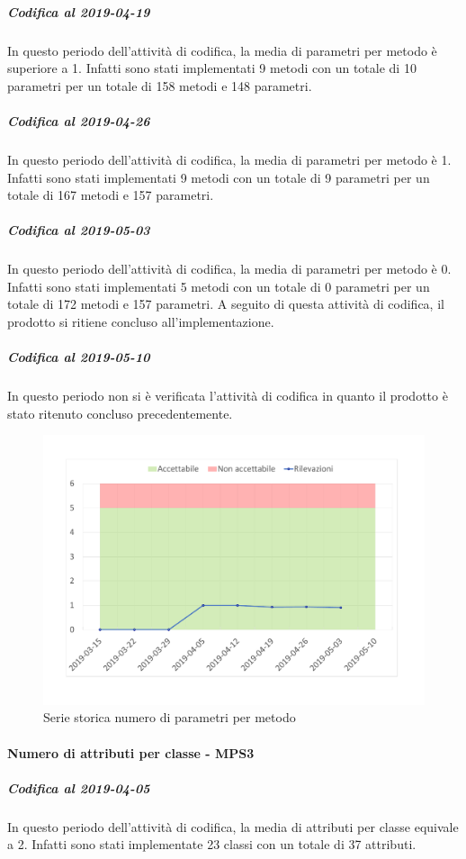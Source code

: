 \subparagraph{Codifica al 2019-04-19}
In questo periodo dell'attività di codifica, la media di parametri per metodo è superiore a 1. Infatti sono stati implementati 9 metodi con un totale di 10 parametri per un totale di 158 metodi e 148 parametri.

\subparagraph{Codifica al 2019-04-26}
In questo periodo dell'attività di codifica, la media di parametri per metodo è 1. Infatti sono stati implementati 9 metodi con un totale di 9 parametri per un totale di 167 metodi e 157 parametri.

\subparagraph{Codifica al 2019-05-03}
In questo periodo dell'attività di codifica, la media di parametri per metodo è 0. Infatti sono stati implementati 5 metodi con un totale di 0 parametri per un totale di 172 metodi e 157 parametri. 
A seguito di questa attività di codifica, il prodotto si ritiene concluso all'implementazione.

\subparagraph{Codifica al 2019-05-10}
In questo periodo non si è verificata l'attività di codifica in quanto il prodotto è stato ritenuto concluso precedentemente.
\\
\begin{figure}[H]
	\centering
	\includegraphics[scale=0.6]{images/resoconto/MPS2Chart.pdf}
	\caption{Serie storica numero di parametri per metodo}	
\end{figure}

\paragraph{Numero di attributi per classe - MPS3}
\subparagraph{Codifica al 2019-04-05}
In questo periodo dell'attività di codifica, la media di attributi per classe equivale a 2. Infatti sono stati implementate 23 classi con un totale di 37 attributi.

